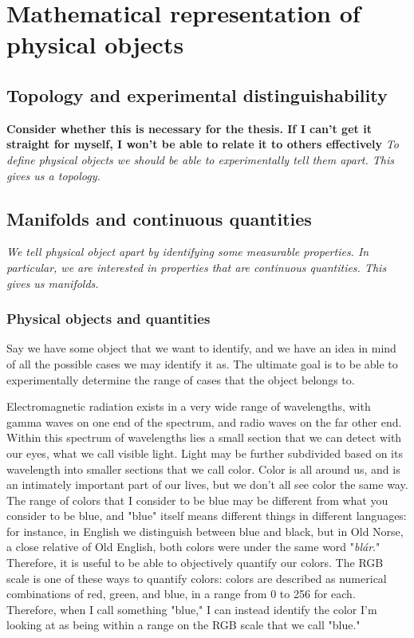\documentclass{book}
\begin{document}
\tableofcontents

\chapter{Mathematical representation of physical objects}

\section{Topology and experimental distinguishability}
\textbf{Consider whether this is necessary for the thesis. If I can't get it straight for myself, I won't be able to relate it to others effectively}
\textit{To define physical objects we should be able to experimentally tell them apart. This gives us a topology.}

\section{Manifolds and continuous quantities}
\emph{We tell physical object apart by identifying some measurable properties. In particular, we are interested in properties that are continuous quantities. This gives us manifolds.}

\subsection{Physical objects and quantities}

Say we have some object that we want to identify, and we have an idea in mind of all the possible cases we may identify it as. The ultimate goal is to be able to experimentally determine the range of cases that the object belongs to. 
 
Electromagnetic radiation exists in a very wide range of wavelengths, with gamma waves on one end of the spectrum, and radio waves on the far other end. Within this spectrum of wavelengths lies a small section that we can detect with our eyes, what we call visible light. Light may be further subdivided based on its wavelength into smaller sections that we call color. Color is all around us, and is an intimately important part of our lives, but we don't all see color the same way. The range of colors that I consider to be blue may be different from what you consider to be blue, and "blue" itself means different things in different languages: for instance, in English we distinguish between blue and black, but in Old Norse, a close relative of Old English, both colors were under the same word "\textit{blár}." Therefore, it is useful to be able to objectively quantify our colors. The RGB scale is one of these ways to quantify colors: colors are described as numerical combinations of red, green, and blue, in a range from 0 to 256 for each. Therefore, when I call something "blue," I can instead identify the color I'm looking at as being within a range on the RGB scale that we call "blue."
\end{document}
